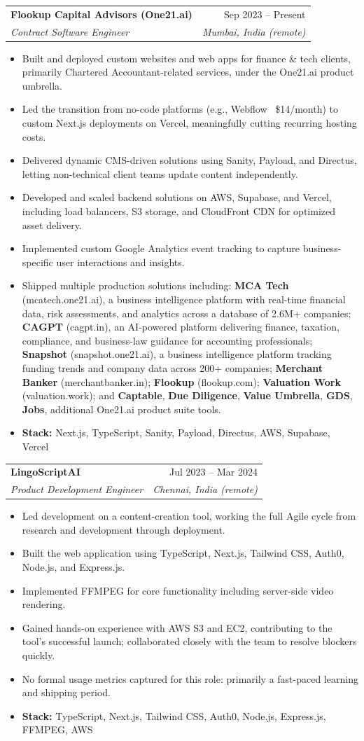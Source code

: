 \documentclass[letterpaper,11pt]{article}
\makeatletter
\newcommand{\resumeItem}[1]{
  \item\small{
    {#1 \vspace{-2pt}}
  }
}
\newcommand{\resumeSubheading}[4]{
  \vspace{-2pt}\item
    \begin{tabular*}{0.97\textwidth}[t]{l@{\extracolsep{\fill}}r}
      \textbf{#1} & #2 \\
      \textit{\small#3} & \textit{\small #4} \\
    \end{tabular*}\vspace{-7pt}
}
\newcommand{\resumeItemListStart}{\begin{itemize}}
\newcommand{\resumeItemListEnd}{\end{itemize}\vspace{-5pt}}
\makeatother
\begin{document}
    \resumeSubheading
      {Flookup Capital Advisors (One21.ai)}{Sep 2023 -- Present}
      {Contract Software Engineer}{Mumbai, India (remote)}
      \resumeItemListStart
        \resumeItem{Built and deployed custom websites and web apps for finance \& tech clients, primarily Chartered Accountant-related services, under the One21.ai product umbrella.}
        \resumeItem{Led the transition from no-code platforms (e.g., Webflow ~\$14/month) to custom Next.js deployments on Vercel, meaningfully cutting recurring hosting costs.}
        \resumeItem{Delivered dynamic CMS-driven solutions using Sanity, Payload, and Directus, letting non-technical client teams update content independently.}
        \resumeItem{Developed and scaled backend solutions on AWS, Supabase, and Vercel, including load balancers, S3 storage, and CloudFront CDN for optimized asset delivery.}
        \resumeItem{Implemented custom Google Analytics event tracking to capture business-specific user interactions and insights.}
        \resumeItem{Shipped multiple production solutions including: \textbf{MCA Tech} (mcatech.one21.ai), a business intelligence platform with real-time financial data, risk assessments, and analytics across a database of 2.6M+ companies; \textbf{CAGPT} (cagpt.in), an AI-powered platform delivering finance, taxation, compliance, and business-law guidance for accounting professionals; \textbf{Snapshot} (snapshot.one21.ai), a business intelligence platform tracking funding trends and company data across 200+ companies; \textbf{Merchant Banker} (merchantbanker.in); \textbf{Flookup} (flookup.com); \textbf{Valuation Work} (valuation.work); and \textbf{Captable}, \textbf{Due Diligence}, \textbf{Value Umbrella}, \textbf{GDS}, \textbf{Jobs}, additional One21.ai product suite tools.}
        \resumeItem{\textbf{Stack:} Next.js, TypeScript, Sanity, Payload, Directus, AWS, Supabase, Vercel}
      \resumeItemListEnd

    \resumeSubheading
      {LingoScriptAI}{Jul 2023 -- Mar 2024}
      {Product Development Engineer}{Chennai, India (remote)}
      \resumeItemListStart
        \resumeItem{Led development on a content-creation tool, working the full Agile cycle from research and development through deployment.}
        \resumeItem{Built the web application using TypeScript, Next.js, Tailwind CSS, Auth0, Node.js, and Express.js.}
        \resumeItem{Implemented FFMPEG for core functionality including server-side video rendering.}
        \resumeItem{Gained hands-on experience with AWS S3 and EC2, contributing to the tool's successful launch; collaborated closely with the team to resolve blockers quickly.}
        \resumeItem{No formal usage metrics captured for this role: primarily a fast-paced learning and shipping period.}
        \resumeItem{\textbf{Stack:} TypeScript, Next.js, Tailwind CSS, Auth0, Node.js, Express.js, FFMPEG, AWS}
      \resumeItemListEnd
\end{document}
